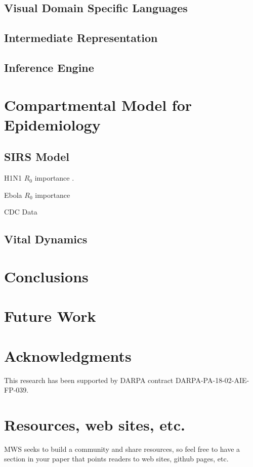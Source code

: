 \documentclass[11pt]{article}
\begin{document}
\subsection{Visual Domain Specific Languages}

\subsection{Intermediate Representation}

\subsection{Inference Engine}

\section{Compartmental Model for Epidemiology}

\subsection{SIRS Model}

H1N1 $R_0$ importance \cite{fraser2009pandemic}.

Ebola $R_0$ importance \cite{fisman2014early}

CDC Data \cite{cdc2019fluview}

\subsection{Vital Dynamics}

\section{Conclusions}

\section{Future Work}

\section{Acknowledgments}

This research has been supported by DARPA contract DARPA-PA-18-02-AIE-FP-039.

\section{Resources, web sites, etc.}

MWS seeks to build a community and share resources, so feel free to have a section in your paper that points readers to web sites, github pages, etc.



\end{document}
